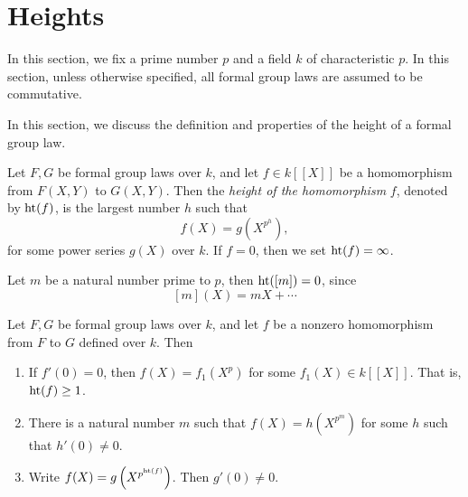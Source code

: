 \section{Heights}

In this section, we fix a prime number $p$ and a field $k$ of characteristic $p$.
In this section,
unless otherwise specified, all formal group laws are assumed to be
commutative.

In this section, we discuss the definition and properties of the height of a formal group law.

\begin{definition}
    Let $F, G$ be formal group laws over $k$, and let $f \in k[\![X]\!]$ be a homomorphism from
    $F(X,Y)$ to $G(X,Y)$. Then the \emph{height of the homomorphism} $f$, denoted by $\mathrm{ht}(f)$,
    is the largest number $h$ such that
    \[f(X) = g\left(X ^ {p ^ h}\right), \]
    for some power series $g(X)$ over $k$. If $f= 0$, then we set $\mathrm{ht}(f) = \infty$.
\end{definition}

\begin{remark}
    Let $m$ be a natural number prime to $p$, then $\mathrm{ht}([m]) = 0$, since
        \[[m](X) = m X + \cdots\]
\end{remark}

\begin{proposition}
    Let $F, G$ be formal group laws over $k$, and let $f$ be a nonzero
    homomorphism from $F$ to $G$ defined over
    $k$. Then
    \begin{enumerate}
        \item If $f'(0) = 0$, then $f(X) = f_1(X ^ p)$ for some $f_1(X) \in k[\![X]\!]$. That is,
            $\mathrm{ht}(f) \ge 1$.
        \item There is a natural number $m$ such that $f(X) = h\left(X^{p^m}\right)$ for some $h$ such that
            $h'(0) \neq 0$.
        \item Write $f(X) = g\left(X^ {p^{\mathrm{ht}(f)}}\right)$. Then $g'(0) \neq 0$.
    \end{enumerate}
    \label{prop: equiv_def_height}
\end{proposition}

